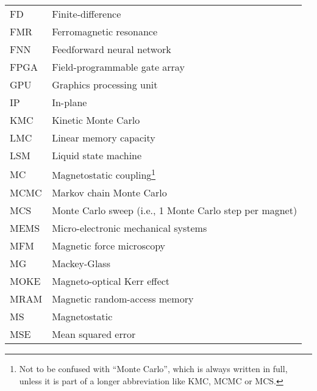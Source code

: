 {\begin{longtable}[l]{ll}
        FD    & Finite-difference                           \\
        FMR   & Ferromagnetic resonance                     \\
        FNN   & Feedforward neural network                  \\
        FPGA  & Field-programmable gate array               \\
        GPU   & Graphics processing unit                    \\
        IP    & In-plane                                    \\
        KMC   & Kinetic Monte Carlo                         \\
        LMC   & Linear memory capacity                      \\
        LSM   & Liquid state machine                        \\
        MC    & Magnetostatic coupling\footnote{Not to be confused with ``Monte Carlo'', which is always written in full, unless it is part of a longer abbreviation like KMC, MCMC or MCS.} \\
        MCMC  & Markov chain Monte Carlo                    \\
        MCS   & Monte Carlo sweep (i.e., 1 Monte Carlo step per magnet) \\
        MEMS  & Micro-electronic mechanical systems         \\
        MFM   & Magnetic force microscopy                   \\
        MG    & Mackey-Glass                                \\
        MOKE  & Magneto-optical Kerr effect                 \\
        MRAM  & Magnetic random-access memory               \\
        MS    & Magnetostatic                               \\
        MSE   & Mean squared error                          \\

\end{longtable}}
